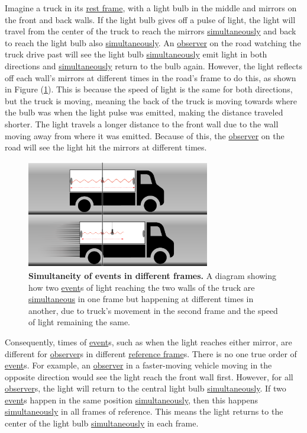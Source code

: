 Imagine a truck in its \hyperlink{def-proper-frame}{rest frame}, with a light bulb in the middle and mirrors on the front and back walls.
If the light bulb gives off a pulse of light, the light will travel from the center of the truck to reach the mirrors \hyperlink{def-simultaneity}{simultaneously} and back to reach the light bulb also \hyperlink{def-simultaneity}{simultaneously}.
An \hyperlink{def-observer}{observer} on the road watching the truck drive past will see the light bulb \hyperlink{def-simultaneity}{simultaneously} emit light in both directions and \hyperlink{def-simultaneity}{simultaneously} return to the bulb again.
However, the light reflects off each wall's mirrors at different times in the road's frame to do this, as shown in Figure (\ref{fig: truck simultaneity}).
This is because the speed of light is the same for both directions, but the truck is moving, meaning the back of the truck is moving towards where the bulb was when the light pulse was emitted, making the distance traveled shorter.
The light travels a longer distance to the front wall due to the wall moving away from where it was emitted.
Because of this, the \hyperlink{def-observer}{observer} on the road will see the light hit the mirrors at different times.

\begin{figure}[htbp]
	\centering
	\includegraphics[width = 8cm]{images/pdf/lorry_simul.pdf}
	\caption{\textbf{Simultaneity of events in different frames.} A diagram showing how two \protect\hyperlink{def-event}{event}s of light reaching the two walls of the truck are \protect\hyperlink{def-simultaneity}{simultaneous} in one frame but happening at different times in another, due to truck's movement in the second frame and the speed of light remaining the same.}
	\label{fig: truck simultaneity}
\end{figure}

Consequently, times of \hyperlink{def-event}{event}s, such as when the light reaches either mirror, are different for \hyperlink{def-observer}{observer}s in different \hyperlink{def-Reference-frame}{reference frame}s.
There is no one true order of \hyperlink{def-event}{event}s.
For example, an \hyperlink{def-observer}{observer} in a faster-moving vehicle moving in the opposite direction would see the light reach the front wall first.
However, for all \hyperlink{def-observer}{observer}s, the light will return to the central light bulb \hyperlink{def-simultaneity}{simultaneously}.
If two \hyperlink{def-event}{event}s happen in the same position \hyperlink{def-simultaneity}{simultaneously}, then this happens \hyperlink{def-simultaneity}{simultaneously} in all frames of reference.
This means the light returns to the center of the light bulb \hyperlink{def-simultaneity}{simultaneously} in each frame.

